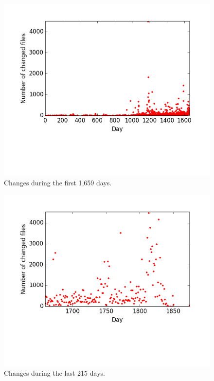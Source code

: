 \documentclass[11pt, twocolumn]{article}
\def \iostarted {1,659}
\def \afterio {215}
\begin{document}
    \begin{figure}
      \centering
      \includegraphics[width=\linewidth]{images/file_changes_per_day_first.png}
      \caption{Changes during the first \iostarted{} days.}
      \label{fig:file_changes_per_day:a}
    \end{figure}
    \begin{figure}
      \centering
      \includegraphics[width=\linewidth]{images/file_changes_per_day_last.png}
      \caption{Changes during the last \afterio{} days.}
      \label{fig:file_changes_per_day:b}
    \end{figure}
\end{document}
